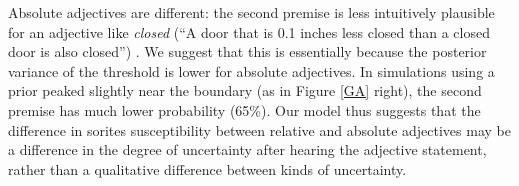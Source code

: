 \documentclass[12pt]{article}
\begin{document}
Absolute adjectives are different: the second premise is less intuitively plausible for an adjective like \emph{closed} (``A door that is 0.1 inches less closed than a closed door is also closed'') \cite{kennedy07}.
We suggest that this is essentially because the posterior variance of the threshold is lower for absolute adjectives. In simulations using a prior peaked slightly near the boundary (as in Figure \ref{GA} right), the second premise has much lower probability (65\%).
%
%
 Our model thus suggests that the difference in sorites susceptibility between relative and absolute adjectives may be a difference in the degree of uncertainty after hearing the adjective statement, rather than a qualitative difference between kinds of uncertainty.


\end{document}
